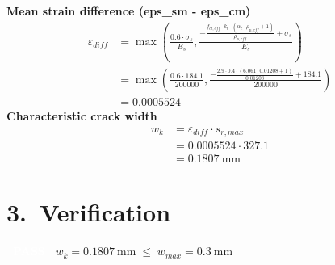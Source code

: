 \documentclass[11pt,a4paper]{article}
\newcommand{\calccheckpass}[1]{\noindent\colorbox{PassGreen}{\textcolor{white}{\textbf{~PASS~}}}\; #1}
\begin{document}
\noindent\textbf{Mean strain difference (eps\_sm - eps\_cm)}
\begin{align*}
\varepsilon_{diff} &= \max\left(\frac{0.6 \cdot \sigma_{s}}{E_{s}}, \frac{- \frac{f_{ct,eff} \cdot k_{t} \cdot \left(\alpha_{e} \cdot \rho_{p,eff} + 1\right)}{\rho_{p,eff}} + \sigma_{s}}{E_{s}}\right) \\
&= \max\left(\frac{0.6 \cdot 184.1}{200000}, \frac{- \frac{2.9 \cdot 0.4 \cdot \left(6.061 \cdot 0.01208 + 1\right)}{0.01208} + 184.1}{200000}\right) \\
&= \mathbf{0.0005524}
\end{align*}
\noindent\textbf{Characteristic crack width}
\begin{align*}
w_{k} &= \varepsilon_{diff} \cdot s_{r,max} \\
&= 0.0005524 \cdot 327.1 \\
&= \mathbf{0.1807}\ \mathrm{mm}
\end{align*}
\section*{\color{BrandPrimary}3.\ Verification}
\calccheckpass{$w_{k} = 0.1807\ \mathrm{mm} \; \le \; w_{max} = 0.3\ \mathrm{mm}$}\par\vspace{4pt}
\end{document}

